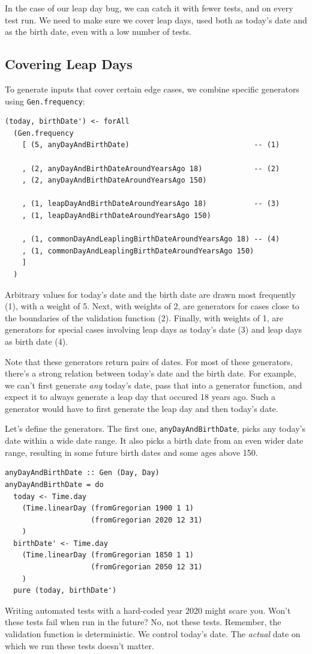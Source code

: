 In the case of our leap day bug, we can catch it with fewer tests, and
on every test run. We need to make sure we cover leap days, used both as
today's date and as the birth date, even with a low number of tests.

\subsection{Covering Leap Days}\label{covering-leap-days}

To generate inputs that cover certain edge cases, we combine specific
generators using \texttt{Gen.frequency}:

\begin{verbatim}
(today, birthDate') <- forAll
  (Gen.frequency
    [ (5, anyDayAndBirthDate)                             -- (1)

    , (2, anyDayAndBirthDateAroundYearsAgo 18)            -- (2)
    , (2, anyDayAndBirthDateAroundYearsAgo 150)

    , (1, leapDayAndBirthDateAroundYearsAgo 18)           -- (3) 
    , (1, leapDayAndBirthDateAroundYearsAgo 150)

    , (1, commonDayAndLeaplingBirthDateAroundYearsAgo 18) -- (4)
    , (1, commonDayAndLeaplingBirthDateAroundYearsAgo 150)
    ]
  )
\end{verbatim}
Arbitrary values for today's date and the birth date are drawn most
frequently (1), with a weight of 5. Next, with weights of 2, are
generators for cases close to the boundaries of the validation function
(2). Finally, with weights of 1, are generators for special cases
involving leap days as today's date (3) and leap days as birth date (4).

Note that these generators return pairs of dates. For most of these
generators, there's a strong relation between today's date and the birth
date. For example, we can't first generate \emph{any} today's date, pass
that into a generator function, and expect it to always generate a leap
day that occured 18 years ago. Such a generator would have to first
generate the leap day and then today's date.

Let's define the generators. The first one, \texttt{anyDayAndBirthDate},
picks any today's date within a wide date range. It also picks a birth
date from an even wider date range, resulting in some future birth dates
and some ages above 150.

\begin{verbatim}
anyDayAndBirthDate :: Gen (Day, Day)
anyDayAndBirthDate = do
  today <- Time.day
    (Time.linearDay (fromGregorian 1900 1 1)
                    (fromGregorian 2020 12 31)
    )
  birthDate' <- Time.day
    (Time.linearDay (fromGregorian 1850 1 1)
                    (fromGregorian 2050 12 31)
    )
  pure (today, birthDate')
\end{verbatim}
Writing automated tests with a hard-coded year 2020 might scare you.
Won't these tests fail when run in the future? No, not these tests.
Remember, the validation function is deterministic. We control today's
date. The \emph{actual} date on which we run these tests doesn't matter.

